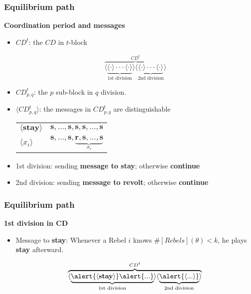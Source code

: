 \documentclass[10pt]{beamer}
\begin{document}
\begin{frame}
\frametitle{Equilibrium path}

\textbf{Coordination period and messages}

\begin{itemize}
\item $CD^t$: the $CD$ in $t$-block

\[\overbrace{\langle\underbrace{\langle \cdot \rangle \cdot \cdot \cdot \langle \cdot \rangle}_{\text{1st division}}\rangle \langle\underbrace{\langle \cdot \rangle \cdot \cdot \cdot \langle \cdot \rangle}_{\text{2nd division}} \rangle }^{CD^t}\] 
\item $CD^t_{p,q}$: the $p$ sub-block in $q$ division.
\item $\langle CD^t_{p,q} \rangle$: the messages in $CD^t_{p,q}$ are \alert{distinguishable}
\begin{table}[h]
\begin{tabular}{l l}
$\langle \textbf{stay} \rangle$ & $\textbf{s},...,\textbf{s},\textbf{s},\textbf{s},...,\textbf{s}$  \\
$\langle x_i\rangle$ & $\textbf{s},...,\textbf{s},\underbrace{\textbf{r},\textbf{s},...,\textbf{s}}_{x_i}$ \\
\end{tabular}
\end{table}
\item 1st division: sending \textbf{message to stay}; otherwise \textbf{continue}
\item 2nd division: sending \textbf{message to revolt}; otherwise \textbf{continue}
\end{itemize}



\end{frame}

\begin{frame}
\frametitle{Equilibrium path}

\textbf{1st division in CD}

\begin{itemize}
\item \alert{Message to \textbf{stay}}: Whenever a Rebel $i$ knows \alert{$\#[Rebels](\theta)<k$}, he plays \textbf{stay} afterward.

\[\overbrace{\langle\underbrace{\alert{\langle \textbf{stay} \rangle}  \alert{...} }_{\text{1st division}}\rangle \langle\underbrace{\alert{\langle ... \rangle}}_{\text{2nd division}} \rangle }^{CD^t}\] 


\end{itemize}

\end{frame}
\end{document}
